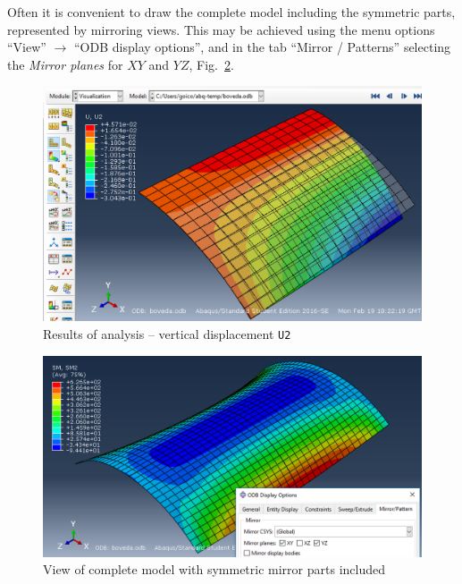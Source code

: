 \documentclass[english,a4paper,12pt]{article}
\begin{document}
Often it is convenient to draw the complete model including the symmetric parts, represented by mirroring views.
This may be achieved using the menu options ``View'' $\to$ ``ODB display options'', and in the tab ``Mirror / Patterns'' selecting the \emph{Mirror planes} for $XY$ and $YZ$, Fig.~\ref{fig:job-results-symm}.
\begin{figure}[h!tp]
\centering
\includegraphics[scale=0.45]{capturas2019/a_fig23.png}
\caption{Results of analysis -- vertical displacement \texttt{U2}}
\label{fig:job-results}
\end{figure}
\begin{figure}[h!tp]
\centering
\includegraphics[scale=0.45]{capturas2019/a_fig24p.png}
\caption{View of complete model with symmetric mirror parts included}
\label{fig:job-results-symm}
\end{figure}
\clearpage
\end{document}
